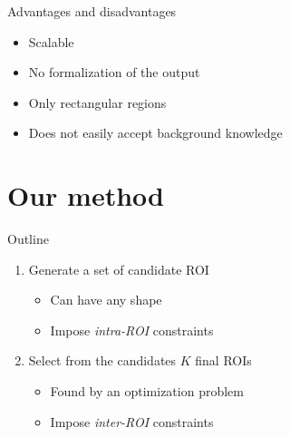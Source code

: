 \documentclass[10pt]{beamer}
\begin{document}
\begin{frame}{Advantages and disadvantages}
    \begin{itemize}
        \item Scalable
        \item No formalization of the output
        \item Only rectangular regions
        \item Does not easily accept background knowledge
    \end{itemize}
\end{frame}

\section{Our method}

\begin{frame}{Outline}
    \begin{enumerate}
        \item Generate a set of candidate ROI
        \begin{itemize}
            \item Can have any shape
            \item Impose \emph{intra-ROI} constraints
        \end{itemize}
        \item Select from the candidates $K$ final ROIs
        \begin{itemize}
            \item Found by an optimization problem
            \item Impose \emph{inter-ROI} constraints
        \end{itemize}
    \end{enumerate}
\end{frame}
\end{document}
